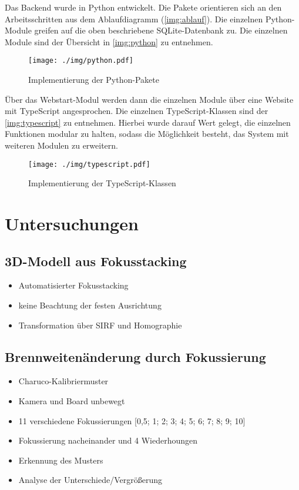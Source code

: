 \documentclass[./00_PhotoBox.tex]{subfiles}
\begin{document}
Das Backend wurde in Python entwickelt. Die Pakete orientieren sich an den Arbeitsschritten aus dem Ablaufdiagramm (\autoref{img:ablauf}). Die einzelnen Python-Module greifen auf die oben beschriebene SQLite-Datenbank zu. Die einzelnen Module sind der Übersicht in \autoref{img:python} zu entnehmen.

\begin{figure}[!htbp]
    \centering
    \texttt{[image: ./img/python.pdf]}
    \centering
    \caption{Implementierung der Python-Pakete} %
    \label{img:python} %
\end{figure}

Über das Webstart-Modul werden dann die einzelnen Module über eine Website mit TypeScript angesprochen. Die einzelnen TypeScript-Klassen sind der \autoref{img:typescript} zu entnehmen. Hierbei wurde darauf Wert gelegt, die einzelnen Funktionen modular zu halten, sodass die Möglichkeit besteht, das System mit weiteren Modulen zu erweitern.

\begin{figure}[!htbp]
    \centering
    \texttt{[image: ./img/typescript.pdf]}
    \centering
    \caption{Implementierung der TypeScript-Klassen} %
    \label{img:typescript} %
\end{figure}

\section{Untersuchungen}

\subsection{3D-Modell aus Fokusstacking}
\begin{itemize}
    \item Automatisierter Fokusstacking
    \item keine Beachtung der festen Ausrichtung
    \item Transformation über SIRF und Homographie
\end{itemize}


\subsection{Brennweitenänderung durch Fokussierung}
\begin{itemize}
    \item Charuco-Kalibriermuster
    \item Kamera und Board unbewegt
    \item 11 verschiedene Fokussierungen [0,5; 1; 2; 3; 4; 5; 6; 7; 8; 9; 10]
    \item Fokussierung nacheinander und 4 Wiederhoungen
    \item Erkennung des Musters
    \item Analyse der Unterschiede/Vergrößerung
\end{itemize}
\end{document}
